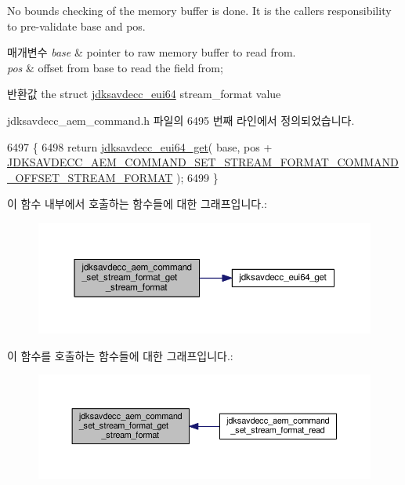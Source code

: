 No bounds checking of the memory buffer is done. It is the caller\textquotesingle{}s responsibility to pre-\/validate base and pos.


\begin{DoxyParams}{매개변수}
{\em base} & pointer to raw memory buffer to read from. \\
\hline
{\em pos} & offset from base to read the field from; \\
\hline
\end{DoxyParams}
\begin{DoxyReturn}{반환값}
the struct \hyperlink{structjdksavdecc__eui64}{jdksavdecc\+\_\+eui64} stream\+\_\+format value 
\end{DoxyReturn}


jdksavdecc\+\_\+aem\+\_\+command.\+h 파일의 6495 번째 라인에서 정의되었습니다.


\begin{DoxyCode}
6497 \{
6498     \textcolor{keywordflow}{return} \hyperlink{group__eui64_ga2652311a25a6b91cddbed75c108c7031}{jdksavdecc\_eui64\_get}( base, pos + 
      \hyperlink{group__command__set__stream__format_ga47e12fafe288a15811b8aeec4cbe96b2}{JDKSAVDECC\_AEM\_COMMAND\_SET\_STREAM\_FORMAT\_COMMAND\_OFFSET\_STREAM\_FORMAT}
       );
6499 \}
\end{DoxyCode}


이 함수 내부에서 호출하는 함수들에 대한 그래프입니다.\+:
\nopagebreak
\begin{figure}[H]
\begin{center}
\leavevmode
\includegraphics[width=350pt]{group__command__set__stream__format_ga54974d0b8f7e1ee1922df3a65d2a44a7_cgraph}
\end{center}
\end{figure}




이 함수를 호출하는 함수들에 대한 그래프입니다.\+:
\nopagebreak
\begin{figure}[H]
\begin{center}
\leavevmode
\includegraphics[width=350pt]{group__command__set__stream__format_ga54974d0b8f7e1ee1922df3a65d2a44a7_icgraph}
\end{center}
\end{figure}


